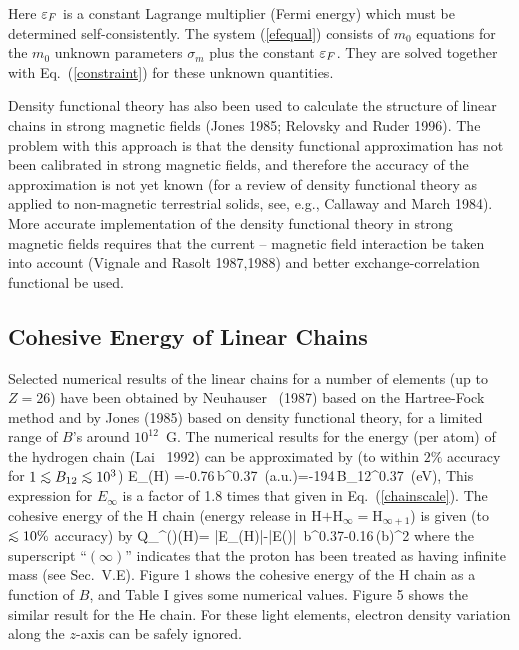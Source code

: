 Here ${\varepsilon}_F$ is a constant Lagrange multiplier (Fermi energy) which 
must be determined self-consistently.
The system (\ref{efequal}) consists of $m_0$ equations for the $m_0$ unknown
parameters $\sigma_m$ plus the constant ${\varepsilon}_F$.
They are solved together with Eq.~(\ref{constraint}) for these unknown 
quantities.

Density functional theory has also been used to calculate
the structure of linear chains in strong magnetic fields (Jones 1985; 
Relovsky and Ruder 1996). The problem with this approach is that the density
functional approximation has not been calibrated in strong magnetic fields, 
and therefore the accuracy of the approximation is not yet known (for a 
review of density functional theory as applied to non-magnetic terrestrial
solids, see, e.g., Callaway and March 1984). More accurate implementation of
the density functional theory in strong magnetic fields requires that the
current -- magnetic field interaction be taken into account (Vignale and 
Rasolt 1987,1988) and better exchange-correlation functional be used. 

\subsection{Cohesive Energy of Linear Chains}

Selected numerical results of the linear chains for a number of elements 
(up to $Z=26$) have been obtained by Neuhauser \etal~(1987) based on the
Hartree-Fock method and by Jones (1985) based on density functional 
theory, for a limited range of $B$'s around $10^{12}$~G. 
The numerical results for the energy 
(per atom) of the hydrogen chain (Lai \etal~1992) can be approximated by 
(to within $2\%$ accuracy for $1\lo B_{12} \lo 10^3$) 
\be
E_{\infty}({\rm H})
=-0.76\,b^{0.37}~({\rm a.u.})=-194\,B_{12}^{0.37}~({\rm eV}),
\label{hchain}\ee
This expression for $E_\infty$ is a factor of 1.8 times
that given in Eq.~(\ref{chainscale}). The cohesive energy of the 
H chain (energy release in H$+$H$_{\infty}=$H$_{\infty+1}$) is given (to
$\lo 10\%$ accuracy) by 
\be
Q_{\infty}^{(\infty)}({\rm H})=
|E_{\infty}({\rm H})|-|E(\rH)| \,b^{0.37}-0.16\,(\ln b)^2
\ee
where the superscript ``$(\infty)$'' indicates that the proton
has been treated as having infinite mass (see Sec.~V.E).
Figure 1 shows the cohesive energy of the H chain as a function
of $B$, and Table I gives some numerical values.
Figure 5 shows the similar result for the He chain. 
For these light elements, electron 
density variation along the $z$-axis can be safely ignored.

